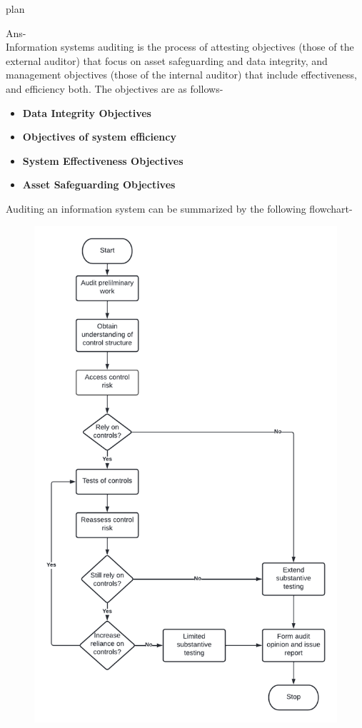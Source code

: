 \documentclass[12pt]{article}
\begin{document}
plan
\par
Ans-\\
Information systems auditing is the process of attesting objectives (those of the external auditor) that focus on asset safeguarding and data integrity, and management objectives (those of the internal auditor) that include effectiveness, and efficiency both. 
The objectives are as follows-
\begin{itemize}
    \item \textbf{Data Integrity Objectives}
    \item \textbf{Objectives of system efficiency}
    \item \textbf{System Effectiveness Objectives}
    \item \textbf{Asset Safeguarding Objectives}
\end{itemize}
\newpage
Auditing an information system can be summarized by the following flowchart-
\begin{figure}[h] %
\centering
\includegraphics[scale=0.3005]{Blank diagram.png}
\end{figure}
\end{document}
